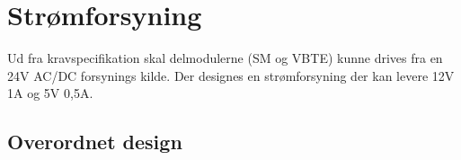 \chapter{Strømforsyning}
Ud fra kravspecifikation skal delmodulerne (SM og VBTE) kunne drives fra en 24V AC/DC forsynings kilde. Der designes en strømforsyning der kan levere 12V 1A og 5V 0,5A.  

\section{Overordnet design}
